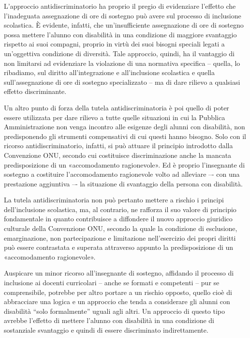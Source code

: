L'approccio antidiscriminatorio ha proprio il pregio di evidenziare l'effetto che l'inadeguata assegnazione di ore di sostegno può avere sul processo di inclusione scolastica. È evidente, infatti, che un'insufficiente assegnazione di ore di sostegno possa mettere l'alunno con disabilità in una condizione di maggiore svantaggio rispetto ai suoi compagni, proprio in virtù dei suoi bisogni speciali legati a un'oggettiva condizione di diversità. Tale approccio, quindi, ha il vantaggio di non limitarsi ad evidenziare la violazione di una normativa specifica – quella, lo ribadiamo, sul diritto all'integrazione e all'inclusione scolastica e quella sull'assegnazione di ore di sostegno specializzato – ma di dare rilievo a qualsiasi effetto discriminante.

Un altro punto di forza della tutela antidiscriminatoria è poi quello di poter essere utilizzata per dare rilievo a tutte quelle situazioni in cui la Pubblica Amministrazione non venga incontro alle esigenze degli alunni con disabilità, non predisponendo gli strumenti compensativi di cui questi hanno bisogno. Solo con il ricorso antidiscriminatorio, infatti, si può attuare il principio introdotto dalla Convenzione ONU, secondo cui costituisce discriminazione anche la mancata predisposizione di un «accomodamento ragionevole». Ed è proprio l'insegnante di sostegno a costituire l'accomodamento ragionevole volto ad alleviare –- con una prestazione aggiuntiva –- la situazione di svantaggio della persona con disabilità.

La tutela antidiscriminatoria non può pertanto mettere a rischio i principi dell'inclusione scolastica, ma, al contrario, ne rafforza il suo valore di principio fondamentale in quanto contribuisce a diffondere il nuovo approccio giuridico culturale della Convenzione ONU, secondo la quale la condizione di esclusione, emarginazione, non partecipazione e limitazione nell'esercizio dei propri diritti può essere contrastata e superata attraverso appunto la predisposizione di un «accomodamento ragionevole».

Auspicare un minor ricorso all'insegnante di sostegno, affidando il processo di inclusione ai docenti curricolari – anche se formati e competenti – pur se comprensibile, potrebbe per altro portare a un rischio opposto, quello cioè di abbracciare una logica e un approccio che tenda a considerare gli alunni con disabilità “solo formalmente” uguali agli altri. Un approccio di questo tipo avrebbe l'effetto di mettere l'alunno con disabilità in una condizione di sostanziale svantaggio e quindi di essere discriminato indirettamente.

